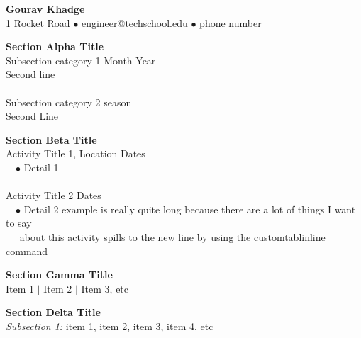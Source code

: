 \documentclass[12pt]{article}
\makeatletter
\newcommand{\name}{\large\textbf{Gourav Khadge}} %
\newcommand{\addr}{\small 1 Rocket Road}
\newcommand{\email}{\small \url{engineer@techschool.edu}}
\newcommand{\phone}{\small phone number }
\newcommand{\headerdot}{  $\bullet$  }
\newcommand{\vb}{ $\mid$ }
\newcommand{\sectionNL}{\\[2pt]}
\newcommand{\rightalign}{\hfill}
\newcommand{\customtab}{$\hspace{10pt}\bullet\hspace{2pt}$}
\newcommand{\customtabinline}{$\hspace{17pt}$}
\makeatother
\begin{document}
\begin{center}
\name \\
\addr \headerdot \email \headerdot \phone
\end{center}

\begin{flushleft}
{\textbf{Section Alpha Title}}  \sectionNL
Subsection category 1 \rightalign Month Year \\
Second line   \\~\\
Subsection category 2 \rightalign season \\
Second Line
\end{flushleft}


\begin{flushleft}
{\textbf{Section Beta Title}}  \sectionNL
Activity Title 1, Location \rightalign Dates \\
\customtab Detail 1   \\~\\

Activity Title 2 \rightalign Dates \\
\customtab Detail 2 example is really quite long because there are a lot of things I want to say \\ \customtabinline about this activity spills to the new line by using the customtablinline command
\end{flushleft}


\begin{flushleft}
{\textbf{Section Gamma Title }} \sectionNL
Item 1 \vb Item 2 \vb Item 3, etc 
\end{flushleft}

\begin{flushleft}
{\textbf{Section Delta Title}} \sectionNL
\textit{Subsection 1:} item 1, item 2, item 3, item 4, etc
\end{flushleft}
\end{document}
